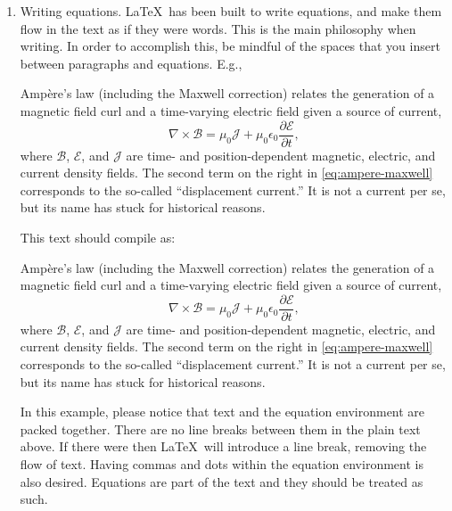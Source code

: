 \begin{enumerate}
  \item Writing equations. \LaTeX\ has been built to write equations, and make them flow in the text as if they were words. This is the main philosophy when writing. In order to accomplish this, be mindful of the spaces that you insert between paragraphs and equations. E.g.,
  
  \begin{verbnobox}[\small]
    Ampère's law (including the Maxwell correction) relates the generation 
    of a magnetic field curl and a time-varying electric field given a 
    source of current,
    \begin{equation}
      \nabla \times \boldsymbol{\mathcal{B}} = 
      \mu_0 \boldsymbol{\mathcal{J}} + 
      \mu_0 \epsilon_0 \frac{\partial\boldsymbol{\mathcal{E}}}{\partial t},
    \end{equation}
    where $\boldsymbol{\mathcal{B}}$, $\boldsymbol{\mathcal{E}}$, 
    and $\boldsymbol{\mathcal{J}}$ are time- and position-dependent 
    magnetic, electric, and current density fields. 
    The second term on the right in 
    \cref{eq:ampere-maxwell} corresponds to the so-called 
    ``displacement current.'' It is not a current per se, but its name 
    has stuck for historical reasons.
  \end{verbnobox}
  
  This text should compile as:

  Ampère's law (including the Maxwell correction) relates the generation of a magnetic field curl and a time-varying electric field given a source of current,
  \begin{equation}
    \nabla \times \boldsymbol{\mathcal{B}} = \mu_0 \boldsymbol{\mathcal{J}} + \mu_0 \epsilon_0 \frac{\partial \boldsymbol{\mathcal{E}}}{\partial t}, \label{eq:ampere-maxwell}
  \end{equation}
  where $\boldsymbol{\mathcal{B}}$, $\boldsymbol{\mathcal{E}}$, and $\boldsymbol{\mathcal{J}}$ are time- and position-dependent magnetic, electric, and current density fields. The second term on the right in \cref{eq:ampere-maxwell} corresponds to the so-called ``displacement current.'' It is not a current per se, but its name has stuck for historical reasons.

  In this example, please notice that text and the equation environment are packed together. There are no line breaks between them in the plain text above. If there were then \LaTeX\ will introduce a line break, removing the flow of text. Having commas and dots within the equation environment is also desired. Equations are part of the text and they should be treated as such.
  

\end{enumerate}
